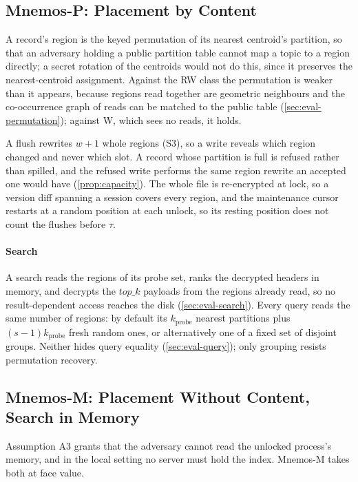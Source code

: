 \subsection{Mnemos-P: Placement by Content}
\label{sec:mnemos-p}
\label{sec:mnemos-write}

A record's region is the keyed permutation of its nearest centroid's partition, so that an adversary
holding a public partition table cannot map a topic to a region directly; a secret rotation of the
centroids would not do this, since it preserves the nearest-centroid assignment. Against the RW
class the permutation is weaker than it appears, because regions read together are geometric
neighbours and the co-occurrence graph of reads can be matched to the public table
(\cref{sec:eval-permutation}); against W, which sees no reads, it holds.

A flush rewrites $w+1$ whole regions (S3), so a write reveals which region changed and never which
slot. A record whose partition is full is refused rather than spilled, and the refused write
performs the same region rewrite an accepted one would have (\cref{prop:capacity}). The whole file is
re-encrypted at lock, so a version diff spanning a session covers every region, and the maintenance
cursor restarts at a random position at each unlock, so its resting position does not count the
flushes before $\tau$.

\paragraph{Search} A search reads the regions of its probe set, ranks the decrypted headers in memory,
and decrypts the $\mathit{top\_k}$ payloads from the regions already read, so no result-dependent
access reaches the disk (\cref{sec:eval-search}). Every query reads the same number of regions: by
default its $k_{\mathrm{probe}}$ nearest partitions plus $(s-1)k_{\mathrm{probe}}$ fresh random
ones, or alternatively one of a fixed set of disjoint groups. Neither hides query equality
(\cref{sec:eval-query}); only grouping resists permutation recovery.
\label{sec:mnemos-read}

\subsection{Mnemos-M: Placement Without Content, Search in Memory}
\label{sec:mnemos-m}

Assumption A3 grants that the adversary cannot read the unlocked process's memory, and in the local
setting no server must hold the index. Mnemos-M takes both at face value.

